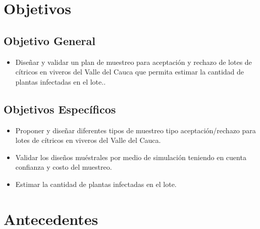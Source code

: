 \section{Objetivos}
\subsection{Objetivo General}
\begin{itemize}
\item Dise\~{n}ar y validar un plan de muestreo para aceptaci\'{o}n y rechazo de lotes de c\'{i}tricos en viveros del Valle del Cauca que permita estimar la cantidad de plantas infectadas en el lote..
\end{itemize}
\subsection{Objetivos Espec\'{i}ficos}
\begin{itemize}
\item Proponer y dise\~{n}ar diferentes tipos de muestreo tipo aceptaci\'{o}n/rechazo para lotes de c\'{i}tricos en viveros del Valle del Cauca.
\item Validar los dise\~{n}os mu\'{e}strales por medio de simulaci\'{o}n teniendo en cuenta confianza y costo del muestreo.
\item Estimar la cantidad de plantas infectadas en el lote.
\end{itemize}
\section{Antecedentes}